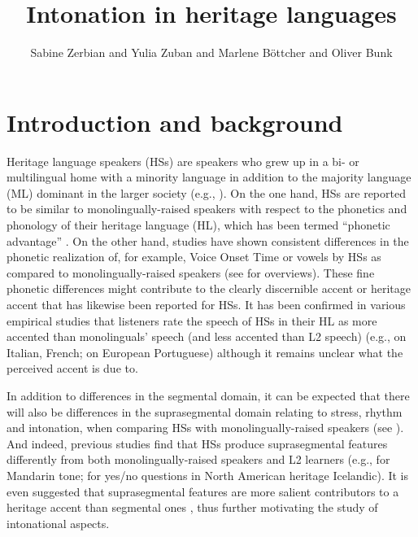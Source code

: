 \documentclass[output=paper,colorlinks,citecolor=brown]{langscibook}
\author{Sabine Zerbian \orcid{0000-0002-4631-369X} \affiliation{University of Stuttgart} and         Yulia Zuban \orcid{0009-0009-3033-1760} \affiliation{University of Stuttgart} and        Marlene Böttcher \orcid{0009-0000-7538-2902} \affiliation{Kiel University} and        Oliver Bunk \orcid{0000-0003-4505-4873} \affiliation{Humboldt-Universität zu Berlin}}
\title{Intonation in heritage languages}
\begin{document}
\maketitle

\section{Introduction and background} \label{chapter12:section 1}

Heritage language speakers (HSs) are speakers who grew up in a bi- or multilingual home with a minority language in addition to the majority language (ML) dominant in the larger society (e.g., \cites{Rothman_2009}[116]{Polinsky_2018}). On the one hand, HSs are reported to be similar to monolingually-raised speakers with respect to the phonetics and phonology of their heritage language (HL), which has been termed “phonetic advantage” \citep[116]{Polinsky_2018}. On the other hand, studies have shown consistent differences in the phonetic realization of, for example, Voice Onset Time or vowels by HSs as compared to monolingually-raised speakers (see \cite{Polinsky_2018, Montrul_2016} for overviews). These fine phonetic differences might contribute to the clearly discernible accent or heritage accent 
\citep{Chang_2021} that has likewise been reported for HSs. It has been confirmed in various empirical studies that listeners rate the speech of HSs in their HL as more accented than monolinguals’ speech (and less accented than L2 speech) (e.g., \cite{Kupisch_Barton_Hailer_Klaschik_Stangen_Lein_vandeWeijer_2014} on Italian, French; \cite{Flores_Rato_2016} on European Portuguese) although it remains unclear what the perceived accent is due to.

In addition to differences in the segmental domain, it can be expected that there will also be differences in the suprasegmental domain relating to stress, rhythm and intonation, when comparing HSs with monolingually-raised speakers (see \cite{Montrul_2016, Polinsky_2018}). And indeed, previous studies find that HSs produce suprasegmental features differently from both monolingually\hyp raised speakers and L2 learners (e.g., \cite{Chang_Yao_2016} for Mandarin tone; \cite{Dehé_2018} for yes/no questions in North American heritage Icelandic). It is even suggested that suprasegmental features are more salient contributors to a heritage accent than segmental ones \citep[601]{Chang_2021}, thus further motivating the study of intonational aspects. 
\end{document}
